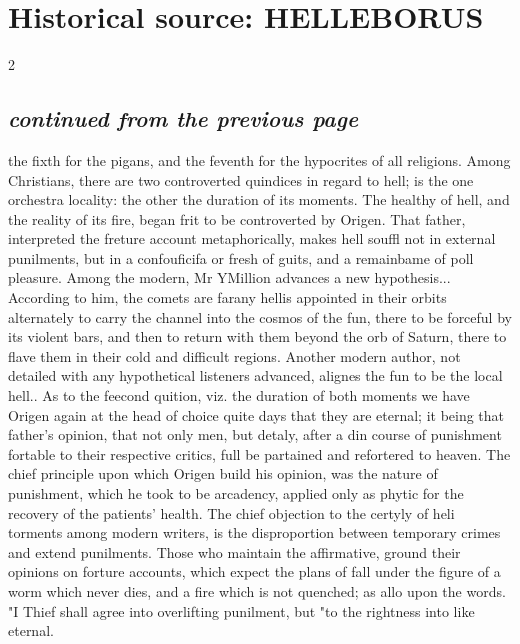 \documentclass[10pt]{article}
\begin{document}
\section*{Historical source: HELLEBORUS}
\begin{multicols}{2}
\subsection*{\textit{continued from the previous page}}
the fixth for the pigans, and the feventh for the hypocrites of all religions. Among Christians, there are two controverted quindices in regard to hell; is the one orchestra locality: the other the duration of its moments. The healthy of hell, and the reality of its fire, began frit to be controverted by Origen. That father, interpreted the freture account metaphorically, makes hell souffl not in external punilments, but in a confouficifa or fresh of guits, and a remainbame of poll pleasure. Among the modern, Mr YMillion advances a new hypothesis... According to him, the comets are farany hellis appointed in their orbits alternately to carry the channel into the cosmos of the fun, there to be forceful by its violent bars, and then to return with them beyond the orb of Saturn, there to flave them in their cold and difficult regions. Another modern author, not detailed with any hypothetical listeners advanced, alignes the fun to be the local hell.. As to the feecond quition, viz. the duration of both moments we have Origen again at the head of choice quite days that they are eternal; it being that father’s opinion, that not only men, but detaly, after a din course of punishment fortable to their respective critics, full be partained and refortered to heaven. The chief principle upon which Origen build his opinion, was the nature of punishment, which he took to be arcadency, applied only as phytic for the recovery of the patients' health. The chief objection to the certyly of heli torments among modern writers, is the disproportion between temporary crimes and extend punilments. Those who maintain the affirmative, ground their opinions on forture accounts, which expect the plans of fall under the figure of a worm which never dies, and a fire which is not quenched; as allo upon the words. "I Thief shall agree into overlifting punilment, but "to the rightness into like eternal.


\end{multicols}
\end{document}
